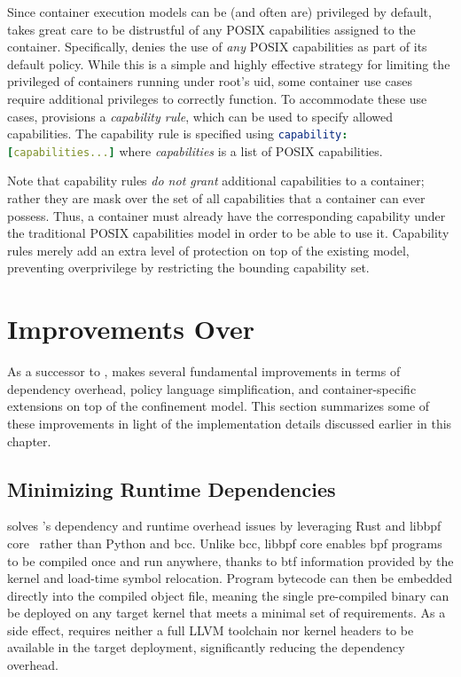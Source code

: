 Since container execution models can be (and often are) privileged by default,
\bpfcontain{} takes great care to be distrustful of any POSIX capabilities assigned to the
container. Specifically, \bpfcontain{} denies the use of \textit{any} POSIX capabilities
as part of its default policy. While this is a simple and highly effective strategy for
limiting the privileged of containers running under root's \gls{uid}, some container use
cases require additional privileges to correctly function. To accommodate these use cases,
\bpfcontain{} provisions a \textit{capability rule}, which can be used to specify allowed
capabilities. The capability rule is specified using \lstinline[language=yaml]|capability: [capabilities...]|
where \textit{capabilities} is a list of POSIX capabilities.

Note that capability rules \textit{do not grant} additional capabilities to a container;
rather they are mask over the set of all capabilities that a container can ever possess.
Thus, a container must already have the corresponding capability under the traditional
POSIX capabilities model in order to be able to use it. Capability rules merely add an
extra level of protection on top of the existing model, preventing overprivilege by
restricting the bounding capability set.


\section{Improvements Over \bpfbox{}}%
\label{s:bpfcontain-improvements}

As a successor to \bpfbox{}, \bpfcontain{} makes several fundamental improvements in terms
of dependency overhead, policy language simplification, and container-specific extensions
on top of the \bpfbox{} confinement model. This section summarizes some of these
improvements in light of the implementation details discussed earlier in this chapter.

\subsection{Minimizing Runtime Dependencies}%
\label{ss:bpfcontain-minimizing}

\bpfcontain{} solves \bpfbox{}'s dependency and runtime overhead issues by leveraging Rust
and libbpf \gls{core}~\cite{nakryiko2020_core} rather than Python and bcc.  Unlike bcc,
libbpf \gls{core} enables \gls{bpf} programs to be compiled once and run anywhere, thanks
to \gls{btf} information provided by the kernel and load-time symbol relocation. Program
bytecode can then be embedded directly into the compiled object file, meaning the single
pre-compiled \bpfcontain{} binary can be deployed on any target kernel that meets
a minimal set of requirements. As a side effect, \bpfcontain{} requires neither a full
LLVM toolchain nor kernel headers to be available in the target deployment, significantly
reducing the dependency overhead.

